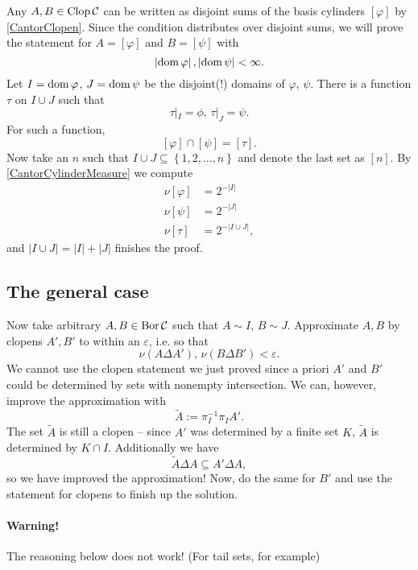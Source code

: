 Any \( A, B \in \operatorname{Clop} \mathcal{C} \) can be written as disjoint sums of the basis cylinders \( \left[ \varphi \right] \) by \ref{CantorClopen}. Since the condition distributes over disjoint sums, we will prove the statement for \( A = \left[ \varphi \right] \) and \( B = \left[ \psi \right] \) with
\[ 
    \left| \operatorname{dom} \varphi \right|, \left| \operatorname{dom} \psi \right| < \infty.
\]
Let \( I = \operatorname{dom} \varphi \), \( J = \operatorname{dom} \psi \) be the disjoint(!) domains of \( \varphi \), \( \psi \). There is a function \( \tau \) on \( I \cup J \) such that
\[ 
    \tau |_I = \phi,\, \tau |_J = \psi.
\]
For such a function,
\[ 
    \left[ \varphi \right] \cap \left[ \psi \right] = \left[ \tau \right]. 
\]
Now take an \( n \) such that \( I \cup J \subseteq \left\{ 1, 2, \ldots, n \right\} \) and denote the last set as \( \left[ n \right] \). By \ref{CantorCylinderMeasure} we compute
\begin{align*}
    \nu \left[ \varphi \right] &= 2^{-|I|} \\
    \nu \left[ \psi \right] &= 2^{-|J|} \\
    \nu \left[ \tau \right] &= 2^{-|I \cup J|},
\end{align*}
and \( |I \cup J| = |I| + |J|  \) finishes the proof. 

\subsection*{The general case}

Now take arbitrary \( A, B \in \operatorname{Bor} \mathcal{C} \) such that \( A \sim I \), \( B \sim J \). Approximate \( A, B \) by clopens \( A', B' \) to within an \(\varepsilon \), i.e. so that
\[ 
    \nu (A \Delta A'),\, \nu (B \Delta B') <\varepsilon. 
\]
We cannot use the clopen statement we just proved since a priori \( A' \) and \( B' \) could be determined by sets with nonempty intersection. We can, however, improve the approximation with
\[ 
    \widetilde{A} := \pi_I^{-1} \pi_I A'.
\]
The set \( \widetilde{A} \) is still a clopen -- since \( A' \) was determined by a finite set \( K \), \( \widetilde{A} \) is determined by \( K \cap I \). Additionally we have
\[ 
    \widetilde{A} \Delta A \subseteq A' \Delta A, 
\]
so we have improved the approximation! Now, do the same for \( B' \) and use the statement for clopens to finish up the solution.

\paragraph{Warning!} The reasoning below does not work! (For tail sets, for example)

